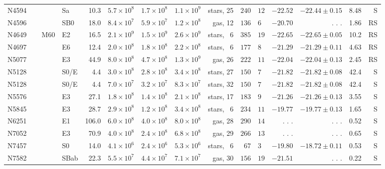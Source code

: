 \documentclass[twosided,letterpaper,numberedappendix]{emulateapj}
\begin{document}
\begin{tabular}{llrrrrrr@{$\pm$}lrrrr}
 N4594       &        Sa &   10.3 & $5.7\times10^{8}$ & $1.7\times10^{8}$ & $1.1\times10^{9}$ & stars, 25 & $240$&$12$ & $-22.52$ & $-22.44 \pm 0.15$ &   8.48 & ~S\\
 N4596\tablenotemark{k}       &       SB0 &   18.0 & $8.4\times10^{7}$ & $5.9\times10^{7}$ & $1.2\times10^{8}$ &   gas, 12 & $136$&$ 6$ & $-20.70$ &  . . . &   1.86 & RS\\
N4649\tablenotemark{h} ~~~ M60 &        E2 &   16.5 & $2.1\times10^{9}$ & $1.5\times10^{9}$ & $2.6\times10^{9}$ & stars, ~6 & $385$&$19$ & $-22.65$ & $-22.65 \pm 0.05$ &   10.2 & RS\\
N4697\tablenotemark{h}       &        E6 &   12.4 & $2.0\times10^{8}$ & $1.8\times10^{8}$ & $2.2\times10^{8}$ & stars, ~6 & $177$&$ 8$ & $-21.29$ & $-21.29 \pm 0.11$ &   4.63 & RS\\
 N5077       &        E3 &   44.9 & $8.0\times10^{8}$ & $4.7\times10^{8}$ & $1.3\times10^{9}$ &   gas, 26 & $222$&$11$ & $-22.04$ & $-22.04 \pm 0.13$ &   2.45 & RS\\
 N5128\tablenotemark{j}\tablenotemark{m}       &      S0/E &    4.4 & $3.0\times10^{8}$ & $2.8\times10^{8}$ & $3.4\times10^{8}$ & stars, 27 & $150$&$ 7$ & $-21.82$ & $-21.82 \pm 0.08$ &   42.4 & ~S\\
 N5128\tablenotemark{j}\tablenotemark{m}       &      S0/E &    4.4 & $7.0\times10^{7}$ & $3.2\times10^{7}$ & $8.3\times10^{7}$ & stars, 32 & $150$&$ 7$ & $-21.82$ & $-21.82 \pm 0.08$ &   42.4 & ~S\\
 N5576       &        E3 &   27.1 & $1.8\times10^{8}$ & $1.4\times10^{8}$ & $2.1\times10^{8}$ & stars, 17 & $183$&$ 9$ & $-21.26$ & $-21.26 \pm 0.13$ &   3.55 & ~S\\
N5845\tablenotemark{h}       &        E3 &   28.7 & $2.9\times10^{8}$ & $1.2\times10^{8}$ & $3.4\times10^{8}$ & stars, ~6 & $234$&$11$ & $-19.77$ & $-19.77 \pm 0.13$ &   1.65 & ~S\\
 N6251       &        E1 &  106.0 & $6.0\times10^{8}$ & $4.0\times10^{8}$ & $8.0\times10^{8}$ &   gas, 28 & $290$&$14$ &  . . . &  . . . &   0.52 & ~S\\
 N7052       &        E3 &   70.9 & $4.0\times10^{8}$ & $2.4\times10^{8}$ & $6.8\times10^{8}$ &   gas, 29 & $266$&$13$ &  . . . &  . . . &   0.65 & ~S\\
N7457\tablenotemark{h}       &        S0 &   14.0 & $4.1\times10^{6}$ & $2.4\times10^{6}$ & $5.3\times10^{6}$ & stars, ~6 & $ 67$&$ 3$ & $-19.80$ & $-18.72 \pm 0.11$ &   0.53 & ~S\\
N7582\tablenotemark{d}\tablenotemark{g}       &      SBab &   22.3 & $5.5\times10^{7}$ & $4.4\times10^{7}$ & $7.1\times10^{7}$ &   gas, 30 & $156$&$19$\tablenotemark{d} & $-21.51$ &  . . . &   0.22 & ~S\\

\end{tabular}
\end{document}
